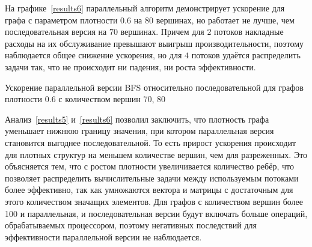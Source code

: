 На графике~\ref{results6} параллельный алгоритм демонстрирует ускорение для графа с параметром плотности $0.6$ на $80$ вершинах, но работает не лучше, чем последовательная версия на $70$ вершинах. Причем для $2$ потоков накладные расходы на их обслуживание превышают выигрыш производительности, поэтому наблюдается общее снижение ускорения, но для $4$ потоков удаётся распределить задачи так, что не происходит ни падения, ни роста эффективности.

\begin{table}
  \centering

\caption{Ускорение параллельной версии BFS относительно последовательной для графов плотности 0.6 с количеством вершин 70, 80}
\label{results6}
\end{table}

Анализ~\ref{results5} и~\ref{results6} позволил заключить, что плотность графа уменьшает нижнюю границу значения, при котором параллельная версия становится выгоднее последовательной. То есть прирост ускорения происходит для плотных структур на меньшем количестве вершин, чем для разреженных.
Это объясняется тем, что с ростом плотности увеличивается количество ребёр, что позволяет распределить вычислительные задачи между используемым потоками более эффективно, так как умножаются вектора и матрицы с достаточным для этого количеством значащих элементов. Для графов с количеством вершин более 100 и параллельная, и последовательная версии будут включать больше операций, обрабатываемых процессором, поэтому негативных последствий для эффективности параллельной версии не наблюдается.